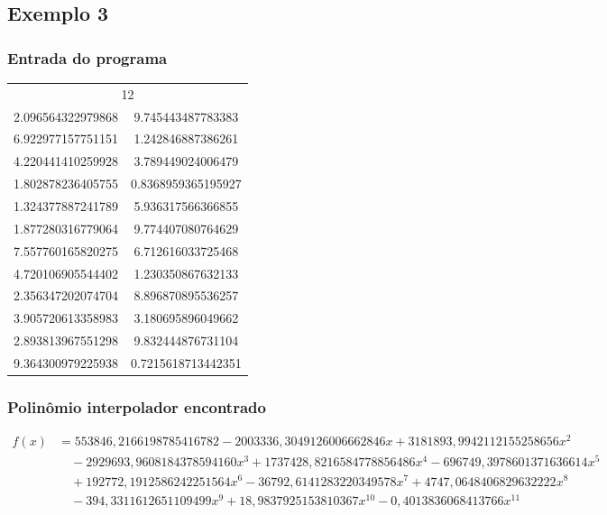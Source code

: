 \documentclass{article}
\begin{document}
        \subsection{Exemplo 3}

                \subsubsection{Entrada do programa}
                    \begin{table}[H]
                        \centering
                        \begin{tabular}{cc}
                            \multicolumn{2}{c}{12} \\
                            2.096564322979868  & 9.745443487783383 \\
                            6.922977157751151  & 1.242846887386261 \\
                            4.220441410259928  & 3.789449024006479 \\
                            1.802878236405755  & 0.8368959365195927 \\
                            1.324377887241789  & 5.936317566366855 \\
                            1.877280316779064  & 9.774407080764629 \\
                            7.557760165820275  & 6.712616033725468 \\
                            4.720106905544402  & 1.230350867632133 \\
                            2.356347202074704  & 8.896870895536257 \\
                            3.905720613358983  & 3.180695896049662 \\
                            2.893813967551298  & 9.832444876731104 \\
                            9.364300979225938  & 0.7215618713442351 \\
                        \end{tabular}
                    \end{table}
                
                \subsubsection{Polinômio interpolador encontrado}
                    \begin{align*}
                    f(x) &= 553846{,}2166198785416782 - 2003336{,}3049126006662846x + 3181893{,}9942112155258656x^2 \\
                        &\quad - 2929693{,}9608184378594160x^3 + 1737428{,}8216584778856486x^4 - 696749{,}3978601371636614x^5 \\
                        &\quad + 192772{,}1912586242251564x^6 - 36792{,}6141283220349578x^7 + 4747{,}0648406829632222x^8 \\
                        &\quad - 394{,}3311612651109499x^9 + 18{,}9837925153810367x^{10} - 0{,}4013836068413766x^{11}
                    \end{align*}
\end{document}
